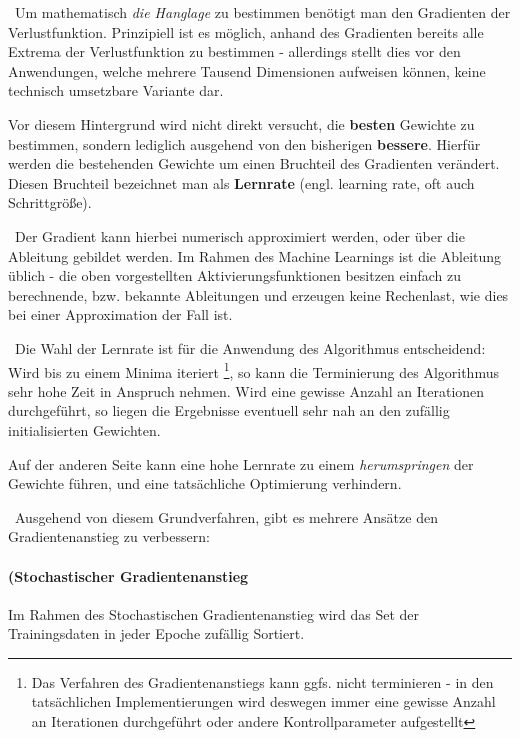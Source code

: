 ~\newline Um mathematisch \textit{die Hanglage} zu bestimmen benötigt man den Gradienten der Verlustfunktion. Prinzipiell ist es möglich, anhand des Gradienten bereits alle Extrema der Verlustfunktion zu bestimmen - allerdings stellt dies vor den Anwendungen, welche mehrere Tausend Dimensionen aufweisen können, keine technisch umsetzbare Variante dar. 

Vor diesem Hintergrund wird nicht direkt versucht, die \textbf{besten} Gewichte zu bestimmen, sondern lediglich ausgehend von den bisherigen \textbf{bessere}. Hierfür werden die bestehenden Gewichte um einen Bruchteil des Gradienten verändert. Diesen Bruchteil bezeichnet man als \textbf{Lernrate} (engl. learning rate, oft auch Schrittgröße).

~\newline Der Gradient kann hierbei numerisch approximiert werden, oder über die Ableitung gebildet werden. Im Rahmen des Machine Learnings ist die Ableitung üblich - die oben vorgestellten Aktivierungsfunktionen besitzen einfach zu berechnende, bzw. bekannte Ableitungen und erzeugen keine Rechenlast, wie dies bei einer Approximation der Fall ist.

~\newline Die Wahl der Lernrate ist für die Anwendung des Algorithmus entscheidend: Wird bis zu einem Minima iteriert \footnote{Das Verfahren des Gradientenanstiegs kann ggfs. nicht terminieren - in den tatsächlichen Implementierungen wird deswegen immer eine gewisse Anzahl an Iterationen durchgeführt oder andere Kontrollparameter aufgestellt}, so kann die Terminierung des Algorithmus sehr hohe Zeit in Anspruch nehmen. Wird eine gewisse Anzahl an Iterationen durchgeführt, so liegen die Ergebnisse eventuell sehr nah an den zufällig initialisierten Gewichten.

Auf der anderen Seite kann eine hohe Lernrate zu einem \textit{herumspringen} der Gewichte führen, und eine tatsächliche Optimierung verhindern.

~\newline Ausgehend von diesem Grundverfahren, gibt es mehrere Ansätze den Gradientenanstieg zu verbessern:

\paragraph{(Stochastischer Gradientenanstieg}
Im Rahmen des Stochastischen Gradientenanstieg wird das Set der Trainingsdaten in jeder Epoche zufällig Sortiert. 

